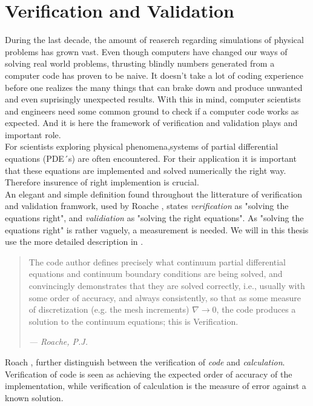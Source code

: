 \chapter{Verification and Validation}
During the last decade, the amount of reaserch regarding simulations of physical problems has grown vast. Even though computers have changed our ways of solving real world problems, thrusting blindly numbers generated from a computer code has proven to be naive. It doesn't take a lot of coding experience before one realizes the many things that can brake down and produce unwanted and even suprisingly unexpected results. 
With this in mind, computer scientists and engineers need some common ground to check if a computer code works as expected. And it is here the framework of verification and validation plays and important role. \\

For scientists exploring physical phenomena,systems of partial differential equations (PDE´s) are often encountered. For their application it is important that these equations are implemented and solved numerically the right way.  Therefore insurence of right implemention is crucial. \\

 An elegant and simple definition found throughout the litterature of verification and validation framwork, used  by Roache \cite{Roache}, states \textit{verification} as "solving the equations right", and  \textit{validiation} as "solving the right equations". As "solving the equations right" is rather vaguely, a measurement is needed. We will in this thesis use the more detailed  description in \cite{Roache}.

\begin{quote}
The code author defines precisely what continuum partial differential equations and continuum boundary conditions are being solved, and convincingly demonstrates that they are solved correctly, i.e., usually with some order of accuracy, and always consistently, so that as some measure of discretization (e.g. the mesh increments) $\nabla \rightarrow 0$, the code produces a solution to the continuum equations; this is Verification.
\begin{flushright}
\textit{--- Roache, P.J.}
\end{flushright}
\end{quote}
 

Roach \cite{Roache2002},  further distinguish between the verification of \textit{code} and \textit{calculation}. Verification of code is seen as achieving the expected order of accuracy of the implementation, while verification of calculation is the measure of error against a known solution. \\

